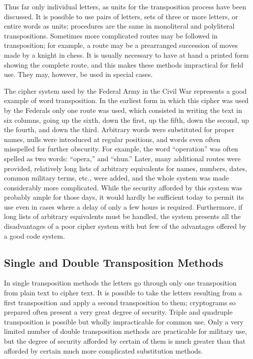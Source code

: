 \mypara Thus far only individual letters, as units for the transposition
process have been discussed. It is possible to use pairs of letters, sets of
three or more letters, or entire words as units; procedures are the same
in monoliteral and polyliteral transpositions. Sometimes more complicated
routes may be followed in transposition; for example, a route may be a
prearranged succession of moves made by a knight in chess. It is usually
necessary to have at hand a printed form showing the complete route,
and this makes these methods impractical for field use. They may, however, be used in special cases.

\mypara The cipher system used by the Federal Army in the Civil War
represents a good example of word transposition. In the earliest form
in which this cipher was used by the Federals only one route was used,
which consisted in writing the text in six columns, going up the sixth,
down the first, up the fifth, down the second, up the fourth, and down
the third. Arbitrary words were substituted for proper names, nulls were
introduced at regular positions, and words even often misspelled for
further obscurity. For example, the word “operation” was often spelled
as two words: “opera,” and “shun.” Later, many additional routes were
provided, relatively long lists of arbitrary equivalents for names, numbers, dates, common military terms, etc., were added, and the whole
system was made considerably more complicated. While the security
afforded by this system was probably ample for those days, it would
hardly be sufficient today to permit its use even in cases where a delay
of only a few hours is required. Furthermore, if long lists of arbitrary
equivalents must be handled, the system presents all the disadvantages of
a poor cipher system with but few of the advantages offered by a good
code system.

\subsection{Single and Double Transposition Methods}

In single transposition methods the letters go through only one transposition from plain text to cipher text. It is possible to take the letters
resulting from a first transposition and apply a second transposition to
them; cryptograms so prepared often present a very great degree of
security. Triple and quadruple transposition is possible but wholly
impracticable for common use. Only a very limited number of double
transposition methods are practicable for military use, but the degree of
security afforded by certain of them is much greater than that afforded
by certain much more complicated substitution methods.

